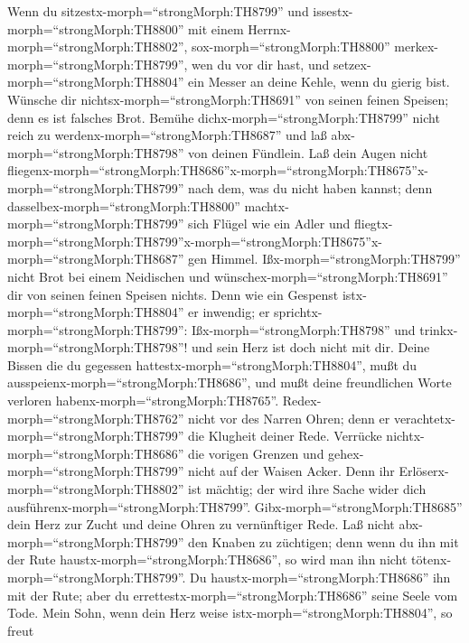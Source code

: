  Wenn du sitzestx-morph=``strongMorph:TH8799'' und
issestx-morph=``strongMorph:TH8800'' mit einem
Herrnx-morph=``strongMorph:TH8802'', sox-morph=``strongMorph:TH8800''
merkex-morph=``strongMorph:TH8799'', wen du vor dir hast, 
und setzex-morph=``strongMorph:TH8804'' ein Messer an deine Kehle, wenn
du gierig bist.  Wünsche dir
nichtsx-morph=``strongMorph:TH8691'' von seinen feinen Speisen; denn es
ist falsches Brot.  Bemühe
dichx-morph=``strongMorph:TH8799'' nicht reich zu
werdenx-morph=``strongMorph:TH8687'' und laß
abx-morph=``strongMorph:TH8798'' von deinen Fündlein.  Laß
dein Augen nicht
fliegenx-morph=``strongMorph:TH8686''\textbar x-morph=``strongMorph:TH8675''x-morph=``strongMorph:TH8799''
nach dem, was du nicht haben kannst; denn
dasselbex-morph=``strongMorph:TH8800''
machtx-morph=``strongMorph:TH8799'' sich Flügel wie ein Adler und
fliegtx-morph=``strongMorph:TH8799''\textbar x-morph=``strongMorph:TH8675''x-morph=``strongMorph:TH8687''
gen Himmel.  Ißx-morph=``strongMorph:TH8799'' nicht Brot bei
einem Neidischen und wünschex-morph=``strongMorph:TH8691'' dir von
seinen feinen Speisen nichts.  Denn wie ein Gespenst
istx-morph=``strongMorph:TH8804'' er inwendig; er
sprichtx-morph=``strongMorph:TH8799'': Ißx-morph=``strongMorph:TH8798''
und trinkx-morph=``strongMorph:TH8798''! und sein Herz ist doch nicht
mit dir.  Deine Bissen die du gegessen
hattestx-morph=``strongMorph:TH8804'', mußt du
ausspeienx-morph=``strongMorph:TH8686'', und mußt deine freundlichen
Worte verloren habenx-morph=``strongMorph:TH8765''. 
Redex-morph=``strongMorph:TH8762'' nicht vor des Narren Ohren; denn er
verachtetx-morph=``strongMorph:TH8799'' die Klugheit deiner Rede.
 Verrücke nichtx-morph=``strongMorph:TH8686'' die vorigen
Grenzen und gehex-morph=``strongMorph:TH8799'' nicht auf der Waisen
Acker.  Denn ihr Erlöserx-morph=``strongMorph:TH8802'' ist
mächtig; der wird ihre Sache wider dich
ausführenx-morph=``strongMorph:TH8799''. 
Gibx-morph=``strongMorph:TH8685'' dein Herz zur Zucht und deine Ohren zu
vernünftiger Rede.  Laß nicht
abx-morph=``strongMorph:TH8799'' den Knaben zu züchtigen; denn wenn du
ihn mit der Rute haustx-morph=``strongMorph:TH8686'', so wird man ihn
nicht tötenx-morph=``strongMorph:TH8799''.  Du
haustx-morph=``strongMorph:TH8686'' ihn mit der Rute; aber du
errettestx-morph=``strongMorph:TH8686'' seine Seele vom Tode.
 Mein Sohn, wenn dein Herz weise
istx-morph=``strongMorph:TH8804'', so freut
